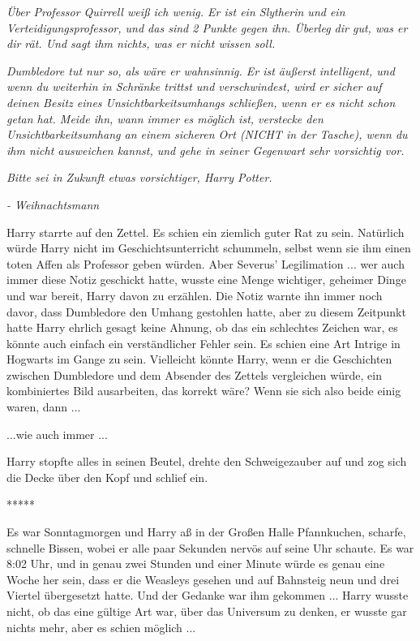 \emph{Über Professor Quirrell weiß ich wenig. Er ist ein Slytherin und ein
Verteidigungsprofessor, und das sind 2 Punkte gegen ihn. Überleg dir gut, was er
dir rät. Und sagt ihm nichts, was er nicht wissen soll.}

\emph{Dumbledore tut nur so, als wäre er wahnsinnig. Er ist äußerst intelligent,
und wenn du weiterhin in Schränke trittst und verschwindest, wird er sicher auf
deinen Besitz eines Unsichtbarkeitsumhangs schließen, wenn er es nicht schon
getan hat. Meide ihn, wann immer es möglich ist, verstecke den
Unsichtbarkeitsumhang an einem sicheren Ort (NICHT in der Tasche), wenn du ihm
nicht ausweichen kannst, und gehe in seiner Gegenwart sehr vorsichtig vor.}

\emph{Bitte sei in Zukunft etwas vorsichtiger, Harry Potter.}

\emph{- Weihnachtsmann}

Harry starrte auf den Zettel. Es schien ein ziemlich guter Rat zu sein.
Natürlich würde Harry nicht im Geschichtsunterricht schummeln, selbst wenn sie
ihm einen toten Affen als Professor geben würden. Aber Severus' Legilimation ...
wer auch immer diese Notiz geschickt hatte, wusste eine Menge wichtiger,
geheimer Dinge und war bereit, Harry davon zu erzählen. Die Notiz warnte ihn
immer noch davor, dass Dumbledore den Umhang gestohlen hatte, aber zu diesem
Zeitpunkt hatte Harry ehrlich gesagt keine Ahnung, ob das ein schlechtes Zeichen
war, es könnte auch einfach ein verständlicher Fehler sein. Es schien eine Art
Intrige in Hogwarts im Gange zu sein. Vielleicht könnte Harry, wenn er die
Geschichten zwischen Dumbledore und dem Absender des Zettels vergleichen würde,
ein kombiniertes Bild ausarbeiten, das korrekt wäre? Wenn sie sich also beide
einig waren, dann ...

...wie auch immer ...

Harry stopfte alles in seinen Beutel, drehte den Schweigezauber auf und zog sich
die Decke über den Kopf und schlief ein.

\begin{center}*****\end{center}

Es war Sonntagmorgen und Harry aß in der Großen Halle Pfannkuchen, scharfe,
schnelle Bissen, wobei er alle paar Sekunden nervös auf seine Uhr schaute. Es
war 8:02 Uhr, und in genau zwei Stunden und einer Minute würde es genau eine
Woche her sein, dass er die Weasleys gesehen und auf Bahnsteig neun und drei
Viertel übergesetzt hatte. Und der Gedanke war ihm gekommen ... Harry wusste
nicht, ob das eine gültige Art war, über das Universum zu denken, er wusste gar
nichts mehr, aber es schien möglich ...

